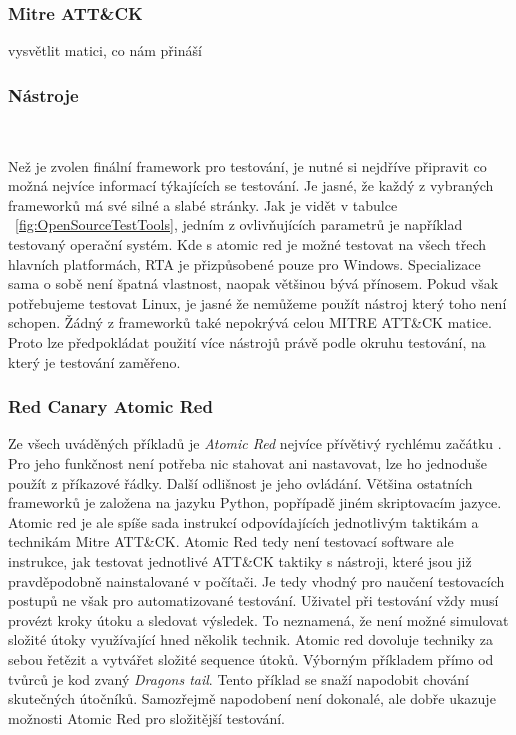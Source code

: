 \subsubsection{Mitre ATT\&CK}
vysvětlit matici, co nám přináší

\subsubsection{Nástroje}
~\label{fig:OpenSourceTestTools}

Než je zvolen finální framework pro testování, je nutné si nejdříve připravit co možná nejvíce informací týkajících se testování.
Je jasné, že každý z vybraných frameworků má své silné a slabé stránky.
Jak je vidět v tabulce ~\ref{fig:OpenSourceTestTools}, jedním z ovlivňujících parametrů je například testovaný operační systém.
Kde s atomic red je možné testovat na všech třech hlavních platformách, \ac{RTA} je přizpůsobené pouze pro Windows.
Specializace sama o sobě není špatná vlastnost, naopak většinou bývá přínosem.
Pokud však potřebujeme testovat Linux, je jasné že nemůžeme použít nástroj který toho není schopen.
Žádný z frameworků také nepokrývá celou MITRE ATT\&CK matice.
Proto lze předpokládat použití více nástrojů právě podle okruhu testování, na který je testování zaměřeno.


\subsubsection{Red Canary Atomic Red}
Ze všech uváděných příkladů je \textit{Atomic Red} nejvíce přívětivý rychlému začátku .
Pro jeho funkčnost není potřeba nic stahovat ani nastavovat, lze ho jednoduše použít z příkazové řádky\cite{redcanary_atomic_red}.
Další odlišnost je jeho ovládání.
Většina ostatních frameworků je založena na jazyku Python, popřípadě jiném skriptovacím jazyce.
Atomic red je ale spíše sada instrukcí odpovídajících jednotlivým taktikám a technikám Mitre ATT\&CK\@.
Atomic Red tedy není testovací software ale instrukce, jak testovat jednotlivé ATT\&CK taktiky s nástroji, které jsou již pravděpodobně nainstalované v počítači.
Je tedy vhodný pro naučení testovacích postupů ne však pro automatizované testování.
Uživatel při testování vždy musí provézt kroky útoku a sledovat výsledek.
To neznamená, že není možné simulovat složité útoky využívající hned několik technik.
Atomic red dovoluje techniky za sebou řetězit a vytvářet složité sequence útoků.
Výborným příkladem přímo od tvůrců je kod zvaný \textit{Dragons tail}\cite{redcanary_dragons_tail}.
Tento příklad se snaží napodobit chování skutečných útočníků.
Samozřejmě napodobení není dokonalé, ale dobře ukazuje možnosti Atomic Red pro složitější testování.\cite{csoonline_4_testing_frameworks}

